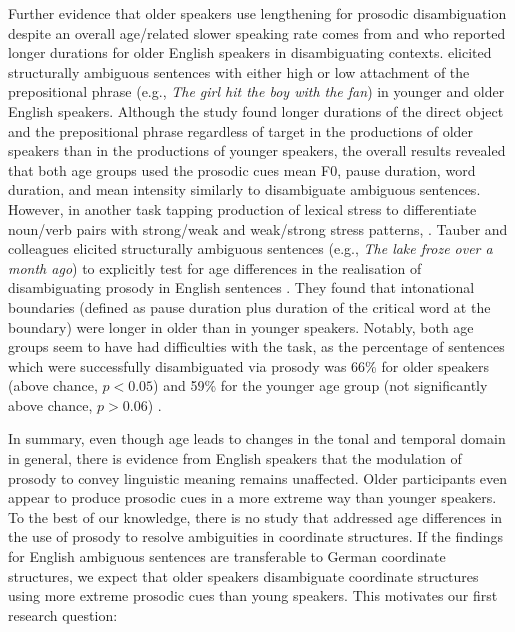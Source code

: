\documentclass[output=paper]{langscibook}
\begin{document}
Further evidence that older speakers use lengthening for prosodic disambiguation despite an overall age\-/related slower speaking rate comes from \citet{tauber_2010_age-effects_prosody} and \citet{barnes_2013} who reported longer durations for older English speakers in disambiguating contexts.
\citet{barnes_2013} elicited structurally ambiguous sentences with either high or low attachment of the prepositional phrase (e.g., \textit{The girl hit the boy with the fan}) in younger and older English speakers. Although the study found longer durations of the direct object and the prepositional phrase regardless of target in the productions of older speakers than in the productions of younger speakers, the overall results revealed that both age groups used the prosodic cues mean F0, pause duration, word duration, and mean intensity similarly to disambiguate  ambiguous sentences. However, in another task tapping production of lexical stress to differentiate noun\-/verb pairs with strong\-/weak and weak\-/strong stress patterns,   \citep[43]{barnes_2013}. Tauber and colleagues elicited structurally ambiguous sentences (e.g., \textit{The lake froze over a month ago}) to explicitly test for age differences in the realisation of disambiguating prosody in English sentences \citep{tauber_2010_age-effects_prosody}. They found that intonational boundaries (defined as pause duration plus duration of the critical word at the boundary) were longer in older than in younger speakers. Notably, both age groups seem to have had difficulties with the task, as the percentage of sentences which were successfully disambiguated via prosody was 66\% for older speakers (above chance, $p<0.05$) and 59\% for the younger age group (not significantly above chance, $p >0.06$) \citep{tauber_2010_age-effects_prosody}.

In summary, even though age leads to changes in the tonal and temporal domain in general, there is evidence from English speakers that the modulation of prosody to convey linguistic meaning remains unaffected. Older participants even appear to produce prosodic cues in a more extreme way than younger speakers. To the best of our knowledge, there is no study that addressed age differences in the use of prosody to resolve ambiguities in coordinate structures. If the findings for English ambiguous sentences are transferable to German coordinate structures, we expect that older speakers disambiguate coordinate structures using more extreme prosodic cues than young speakers. This motivates our first research question:
\end{document}
